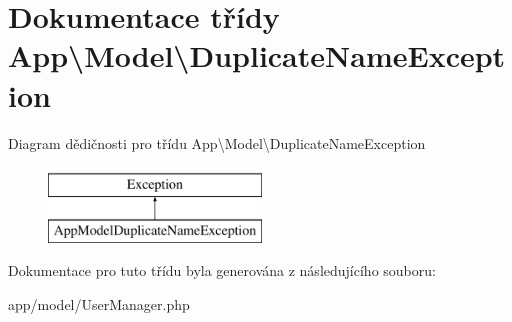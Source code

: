 \hypertarget{classApp_1_1Model_1_1DuplicateNameException}{\section{Dokumentace třídy App\textbackslash{}Model\textbackslash{}Duplicate\-Name\-Exception}
\label{classApp_1_1Model_1_1DuplicateNameException}
}
Diagram dědičnosti pro třídu App\textbackslash{}Model\textbackslash{}Duplicate\-Name\-Exception\begin{figure}[H]
\begin{center}
\leavevmode
\includegraphics[height=2.000000cm]{classApp_1_1Model_1_1DuplicateNameException}
\end{center}
\end{figure}


Dokumentace pro tuto třídu byla generována z následujícího souboru\-:\begin{DoxyCompactItemize}
\item 
app/model/User\-Manager.\-php\end{DoxyCompactItemize}
